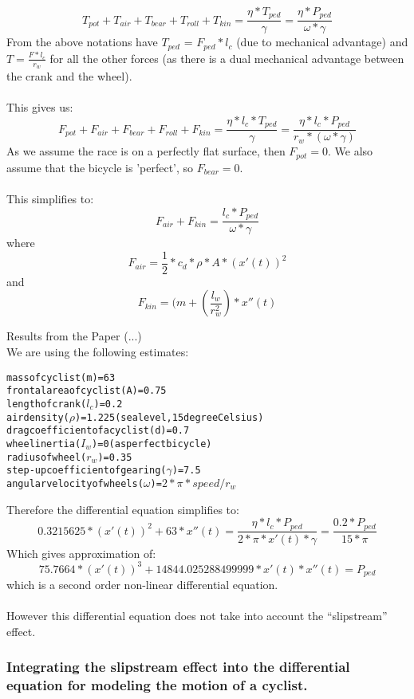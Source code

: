 \documentclass[10pt, a4paper]{report}
\begin{document}
$$ T_{pot} + T_{air} + T_{bear} + T_{roll} + T_{kin} = \frac{ \eta * T_{ped} }{ \gamma }  = \frac{\eta * P_{ped}}{\omega * \gamma} $$
From the above notations have $T_{ped}$ = $F_{ped} * l_{c}$ (due to mechanical advantage) and $T = \frac{F * l_{c}}{r_{w}}$ for all the other forces (as there is a dual mechanical advantage between the crank and the wheel).\\\\
This gives us: $$ F_{pot} + F_{air} + F_{bear} + F_{roll} + F_{kin}
	= \frac{ \eta * l_{c} * T_{ped} }{ \gamma }
	= \frac{ \eta * l_{c} * P_{ped} }{ r_{w} * (\omega * \gamma)} $$
As we assume the race is on a perfectly flat surface, then $F_{pot} = 0$. We also assume that the bicycle is 'perfect', so $F_{bear} = 0$. \\\\
This simplifies to: $$F_{air} + F_{kin} = \frac{l_{c} * P_{ped} }{ \omega * \gamma } $$
where $$ F_{air} 	= \frac{1}{2} * c_{d} * \rho * A * ( x'(t) )^{2} $$
and	  $$ F_{kin} 	= ( m + ( \frac{l_w}{r_w^{2}} ) * x''(t) $$

Results from the Paper (...)\\
We are using the following estimates:

\begin{alltt}
mass of cyclist (m) 				= 63
frontal area of cyclist (A) 		= 0.75
length of crank (\(l_{c}\)) 		= 0.2
air density (\(\rho\)) 				= 1.225 (sea level, 15 degree Celsius)
drag coefficient of a cyclist (d) 	= 0.7
wheel inertia (\(I_w\)) = 0 (as perfect bicycle)
radius of wheel (\(r_w\)) = 0.35
step-up coefficient of gearing (\(\gamma\)) = 7.5
angular velocity of wheels (\(\omega\)) = \(2 * \pi * speed / {r_{w}} \)
\end{alltt}
Therefore the differential equation simplifies to:
$$ 0.3215625 * (x'(t))^{2} + 63 * x''(t)
	= \frac{\eta * l_{c} * P_{ped}} {2 * \pi * x'(t) * \gamma }
	= \frac {0.2 * P_{ped}} {15 * \pi} $$
Which gives approximation of:
$$ 75.7664 *(x'(t))^{3} + 14844.025288499999 * x'(t) * x''(t) = P_{ped}$$
which is a second order non-linear differential equation.\\\\
However this differential equation does not take into account the ``slipstream'' effect.

\subsubsection{Integrating the slipstream effect into the differential equation for modeling the motion of a cyclist.}
\end{document}
